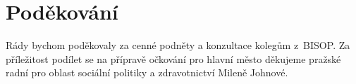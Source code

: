 \section*{Poděkování}

Rády bychom poděkovaly za cenné podněty a konzultace kolegům z~BISOP.
Za příležitost podílet se na přípravě očkování pro hlavní město děkujeme pražské radní pro oblast sociální politiky a zdravotnictví Mileně Johnové.


